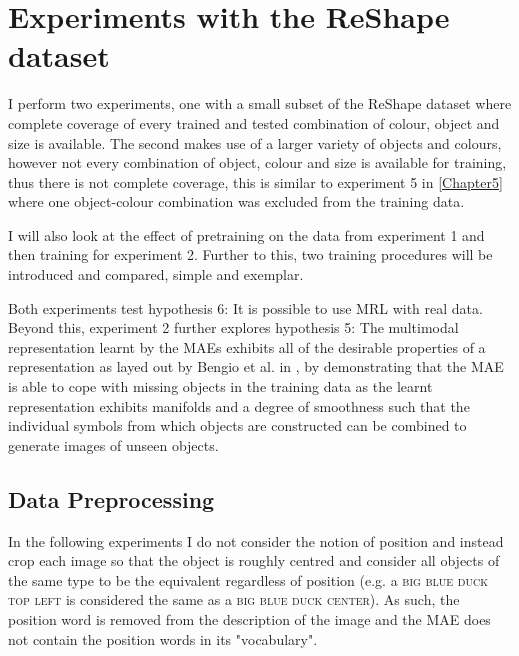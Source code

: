 \section{Experiments with the ReShape dataset}
I perform two experiments, one with a small subset of the ReShape dataset where complete coverage of every trained and tested combination of colour, object and size is available. The second makes use of a larger variety of objects and colours, however not every combination of object, colour and size is available for training, thus there is not complete coverage, this is similar to experiment 5 in \autoref{Chapter5} where one object-colour combination was excluded from the training data. 

I will also look at the effect of pretraining on the data from experiment 1 and then training for experiment 2. Further to this, two training procedures will be introduced and compared, simple and exemplar.

Both experiments test hypothesis 6: It is possible to use \ac{MRL} with real data. Beyond this, experiment 2 further explores hypothesis 5: The multimodal representation learnt by the \acp{MAE} exhibits all of the desirable properties of a representation as layed out by Bengio et al. in \cite{repRev}, by demonstrating that the \ac{MAE} is able to cope with missing objects in the training data as the learnt representation exhibits manifolds and a degree of smoothness such that the individual symbols from which objects are constructed can be combined to generate images of unseen objects.

\subsection{Data Preprocessing}

In the following experiments I do not consider the notion of position and instead crop each image so that the object is roughly centred and consider all objects of the same type to be the equivalent regardless of position (e.g. a \textsc{big blue duck top left} is considered the same as a \textsc{big blue duck center}). As such, the position word is removed from the description of the image and the \ac{MAE} does not contain the position words in its "vocabulary".

